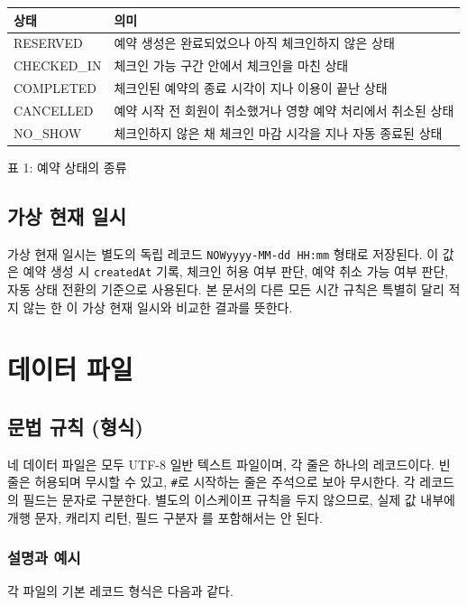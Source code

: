 \documentclass[a4paper,10pt]{article}
\newcommand{\softsep}{\textbar}
\begin{document}
\begin{center}
\begin{tabularx}{0.94\linewidth}{>{\ttfamily\small}l X}
\toprule
상태 & 의미 \\
\midrule
RESERVED & 예약 생성은 완료되었으나 아직 체크인하지 않은 상태 \\
CHECKED\_IN & 체크인 가능 구간 안에서 체크인을 마친 상태 \\
COMPLETED & 체크인된 예약의 종료 시각이 지나 이용이 끝난 상태 \\
CANCELLED & 예약 시작 전 회원이 취소했거나 영향 예약 처리에서 취소된 상태 \\
NO\_SHOW & 체크인하지 않은 채 체크인 마감 시각을 지나 자동 종료된 상태 \\
\bottomrule
\end{tabularx}

표 1: 예약 상태의 종류
\end{center}

\subsection{가상 현재 일시}
가상 현재 일시는 별도의 독립 레코드 \texttt{NOW\softsep{}yyyy-MM-dd HH:mm} 형태로 저장된다. 이 값은 예약 생성 시 \texttt{createdAt} 기록, 체크인 허용 여부 판단, 예약 취소 가능 여부 판단, 자동 상태 전환의 기준으로 사용된다. 본 문서의 다른 모든 시간 규칙은 특별히 달리 적지 않는 한 이 가상 현재 일시와 비교한 결과를 뜻한다.

\section{데이터 파일}

\subsection{문법 규칙 (형식)}
네 데이터 파일은 모두 UTF-8 일반 텍스트 파일이며, 각 줄은 하나의 레코드이다. 빈 줄은 허용되며 무시할 수 있고, \texttt{\#}로 시작하는 줄은 주석으로 보아 무시한다. 각 레코드의 필드는 \softsep{} 문자로 구분한다. 별도의 이스케이프 규칙을 두지 않으므로, 실제 값 내부에 개행 문자, 캐리지 리턴, 필드 구분자 \softsep{}를 포함해서는 안 된다.

\subsubsection{설명과 예시}
각 파일의 기본 레코드 형식은 다음과 같다.
\end{document}
